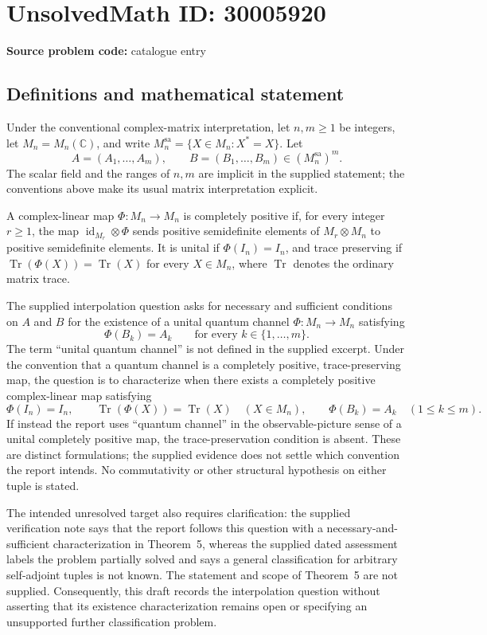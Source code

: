 \documentclass[11pt]{article}
\newcommand{\C}{\mathbb{C}}
\begin{document}
\section*{UnsolvedMath ID: 30005920}
\textbf{Source problem code:} catalogue entry
\subsection{Definitions and mathematical statement}
Under the conventional complex-matrix interpretation, let \(n,m\geq 1\) be integers, let \(M_n=M_n(\C)\), and write \(M_n^{\mathrm{sa}}=\{X\in M_n:X^*=X\}\). Let
\[
A=(A_1,\ldots,A_m),\qquad B=(B_1,\ldots,B_m)\in(M_n^{\mathrm{sa}})^m.
\]
The scalar field and the ranges of \(n,m\) are implicit in the supplied statement; the conventions above make its usual matrix interpretation explicit.

A complex-linear map \(\Phi:M_n\to M_n\) is completely positive if, for every integer \(r\geq 1\), the map \(\operatorname{id}_{M_r}\otimes\Phi\) sends positive semidefinite elements of \(M_r\otimes M_n\) to positive semidefinite elements. It is unital if \(\Phi(I_n)=I_n\), and trace preserving if \(\operatorname{Tr}(\Phi(X))=\operatorname{Tr}(X)\) for every \(X\in M_n\), where \(\operatorname{Tr}\) denotes the ordinary matrix trace.

The supplied interpolation question asks for necessary and sufficient conditions on \(A\) and \(B\) for the existence of a unital quantum channel \(\Phi:M_n\to M_n\) satisfying
\[
\Phi(B_k)=A_k\qquad\text{for every }k\in\{1,\ldots,m\}.
\]
The term ``unital quantum channel'' is not defined in the supplied excerpt. Under the convention that a quantum channel is a completely positive, trace-preserving map, the question is to characterize when there exists a completely positive complex-linear map satisfying
\[
\Phi(I_n)=I_n,\qquad
\operatorname{Tr}(\Phi(X))=\operatorname{Tr}(X)\quad(X\in M_n),\qquad
\Phi(B_k)=A_k\quad(1\leq k\leq m).
\]
If instead the report uses ``quantum channel'' in the observable-picture sense of a unital completely positive map, the trace-preservation condition is absent. These are distinct formulations; the supplied evidence does not settle which convention the report intends. No commutativity or other structural hypothesis on either tuple is stated.

The intended unresolved target also requires clarification: the supplied verification note says that the report follows this question with a necessary-and-sufficient characterization in Theorem~5, whereas the supplied dated assessment labels the problem partially solved and says a general classification for arbitrary self-adjoint tuples is not known. The statement and scope of Theorem~5 are not supplied. Consequently, this draft records the interpolation question without asserting that its existence characterization remains open or specifying an unsupported further classification problem.
\end{document}
